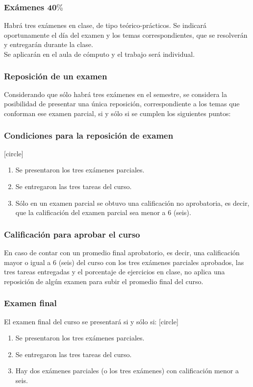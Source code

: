 \begin{frame}
\frametitle{Exámenes $\mathbf{40\%}$}
Habrá tres exámenes en clase, de tipo teórico-prácticos. Se indicará oportunamente el día del examen y los temas correspondientes, que se resolverán y entregarán durante la clase.
\\
\bigskip
Se aplicarán en el aula de cómputo y el trabajo será individual.
\end{frame}
\begin{frame}
\frametitle{Reposición de un examen}
Considerando que sólo habrá tres exámenes en el semestre, se considera la posibilidad de presentar una única reposición, correspondiente a los temas que conforman ese examen parcial, si y sólo si se cumplen los siguientes puntos:
\end{frame}
\begin{frame}
\frametitle{Condiciones para la reposición de examen}
[circle]
\begin{enumerate}[<+->]
\item Se presentaron los tres exámenes parciales.
\item Se entregaron las tres tareas del curso.
\item Sólo en un examen parcial se obtuvo una calificación no aprobatoria, es decir, que la calificación del examen parcial sea menor a $6$ (seis).
\end{enumerate}
\end{frame}
\begin{frame}
\frametitle{Calificación para aprobar el curso}
En caso de contar con un promedio final aprobatorio, es decir, una calificación mayor o igual a $6$ (seis) del curso con los tres exámenes parciales aprobados, las tres tareas entregadas y el porcentaje de ejercicios en clase, \alert{no aplica una reposición de algún examen} para subir el promedio final del curso.
\end{frame}
\begin{frame}
\frametitle{Examen final}
El examen final del curso se presentará si y sólo si:
[circle]
\begin{enumerate}[<+->]
\item Se presentaron los tres exámenes parciales.
\item Se entregaron las tres tareas del curso.
\item Hay dos exámenes parciales (o los tres exámenes) con calificación menor a seis.
\end{enumerate}
\end{frame}

